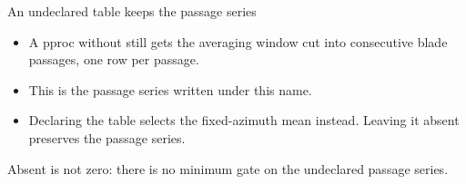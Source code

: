 \begin{frame}{An undeclared table keeps the passage series}
\begin{itemize}
  \item A pproc without  still gets the averaging
        window cut into consecutive blade passages, one row per passage.
  \item This is the passage series written under this name.
  \item Declaring the table selects the fixed-azimuth mean instead.
        Leaving it absent preserves the passage series.
\end{itemize}
\begin{takeaway}
Absent is not zero: there is no minimum gate on the undeclared passage series.
\end{takeaway}
\end{frame}
